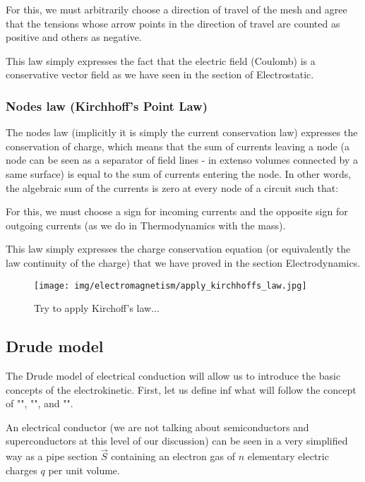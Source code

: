 	For this, we must arbitrarily choose a direction of travel of the mesh and agree that the tensions whose arrow points in the direction of travel are counted as positive and others as negative.
	\begin{tcolorbox}[title=Remark,colframe=black,arc=10pt]
	This law simply expresses the fact that the electric field (Coulomb) is a conservative vector field as we have seen in the section of Electrostatic.
	\end{tcolorbox}
	
	\subsubsection{Nodes law (Kirchhoff's Point Law)}
	The nodes law (implicitly it is simply the current conservation law) expresses the conservation of charge, which means that the sum of currents leaving a node (a node can be seen as a separator of field lines - in extenso volumes connected by a same surface) is equal to the sum of currents entering the node. In other words, the algebraic sum of the currents is zero at every node of a circuit such that:
	
	For this, we must choose a sign for incoming currents and the opposite sign for outgoing currents (as we do in Thermodynamics with the mass).
	\begin{tcolorbox}[title=Remark,colframe=black,arc=10pt]
	This law simply expresses the charge conservation equation (or equivalently the law continuity of the charge) that we have proved in the section Electrodynamics.
	\end{tcolorbox}
	\begin{figure}[H]
		\centering
		\texttt{[image: img/electromagnetism/apply\_kirchhoffs\_law.jpg]}
		\caption[]{Try to apply Kirchoff's law...}
	\end{figure}
	
	\subsection{Drude model}
	The Drude model of electrical conduction will allow us to introduce the basic concepts of the electrokinetic. First, let us define inf what will follow the concept of "", "", and "".
	
	An electrical conductor (we are not talking about semiconductors and superconductors at this level of our discussion) can be seen in a very simplified way as a pipe section $\vec{S}$ containing an electron gas of $n$ elementary electric charges $q$ per unit volume.
	
